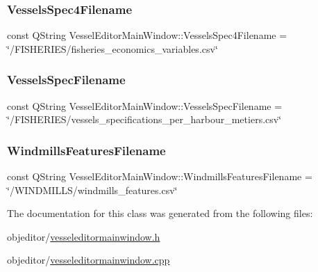 \mbox{\label{class_vessel_editor_main_window_a42619f90f899cb1ff112aa97dccd09c0}} 
\subsubsection{\texorpdfstring{VesselsSpec4Filename}{VesselsSpec4Filename}}
{\footnotesize\ttfamily const Q\+String Vessel\+Editor\+Main\+Window\+::\+Vessels\+Spec4\+Filename = \char`\"{}/F\+I\+S\+H\+E\+R\+I\+ES/fisheries\+\_\+economics\+\_\+variables.\+csv\char`\"{}\hspace{0.3cm}{\ttfamily [static]}}

\mbox{\label{class_vessel_editor_main_window_adc764f34f0bdde92d64c81fb1cd14977}} 
\subsubsection{\texorpdfstring{VesselsSpecFilename}{VesselsSpecFilename}}
{\footnotesize\ttfamily const Q\+String Vessel\+Editor\+Main\+Window\+::\+Vessels\+Spec\+Filename = \char`\"{}/F\+I\+S\+H\+E\+R\+I\+ES/vessels\+\_\+specifications\+\_\+per\+\_\+harbour\+\_\+metiers.\+csv\char`\"{}\hspace{0.3cm}{\ttfamily [static]}}

\mbox{\label{class_vessel_editor_main_window_aef91541f29a6109b2e43c950e5c13cce}} 
\subsubsection{\texorpdfstring{WindmillsFeaturesFilename}{WindmillsFeaturesFilename}}
{\footnotesize\ttfamily const Q\+String Vessel\+Editor\+Main\+Window\+::\+Windmills\+Features\+Filename = \char`\"{}/W\+I\+N\+D\+M\+I\+L\+LS/windmills\+\_\+features.\+csv\char`\"{}\hspace{0.3cm}{\ttfamily [static]}}



The documentation for this class was generated from the following files\+:\begin{DoxyCompactItemize}
\item 
objeditor/\mbox{\hyperlink{vesseleditormainwindow_8h}{vesseleditormainwindow.\+h}}\item 
objeditor/\mbox{\hyperlink{vesseleditormainwindow_8cpp}{vesseleditormainwindow.\+cpp}}\end{DoxyCompactItemize}
